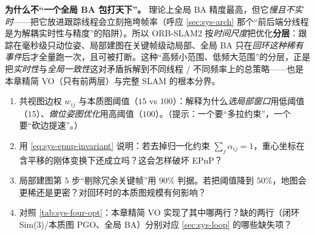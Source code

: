 \begin{insight}
\textbf{为什么不“一个全局 BA 包打天下”。}
理论上全局 BA 精度最高，但它\emph{慢且不实时}——把它放进跟踪线程会立刻拖垮帧率（呼应 \cref{sec:sys-arch} 那个“前后端分线程是为解耦实时性与精度”的陷阱）。所以 ORB-SLAM2 按\emph{时间尺度}把优化\textbf{分层}：跟踪在毫秒级只动位姿、局部建图在关键帧级动局部、全局 BA 只在\emph{回环这种稀有事件}后才全量跑一次，且可被打断。这种“高频小范围、低频大范围”的分层，正是把\emph{实时性}与\emph{全局一致性}这对矛盾拆解到不同线程 / 不同频率上的总策略——也是本章精简 VO（只有前两层）与完整 SLAM 的根本分界。
\end{insight}

\begin{practice}[练习]
\begin{enumerate}
  \item 共视图边权 $w_{ij}$ 与本质图阈值（$15$ vs $100$）：解释为什么\emph{选局部窗口}用低阈值（$15$）、\emph{做位姿图优化}用高阈值（$100$）。（提示：一个要“多拉约束”，一个要“砍边提速”。）
  \item 用 \cref{eq:sys-epnp-invariant} 说明：若去掉归一化约束 $\sum_j\alpha_{ij}=1$，重心坐标在含平移的刚体变换下还成立吗？这会怎样破坏 EPnP？
  \item 局部建图第 $5$ 步“剔除冗余关键帧”用 $90\%$ 判据。若把阈值降到 $50\%$，地图会更稀还是更密？对回环时的本质图规模有何影响？
  \item 对照 \cref{tab:sys-four-opt}：本章精简 VO 实现了其中哪两行？缺的两行（闭环 Sim(3)/本质图 PGO、全局 BA）分别对应 \cref{sec:sys-loop} 的哪些缺失项？
\end{enumerate}
\end{practice}


